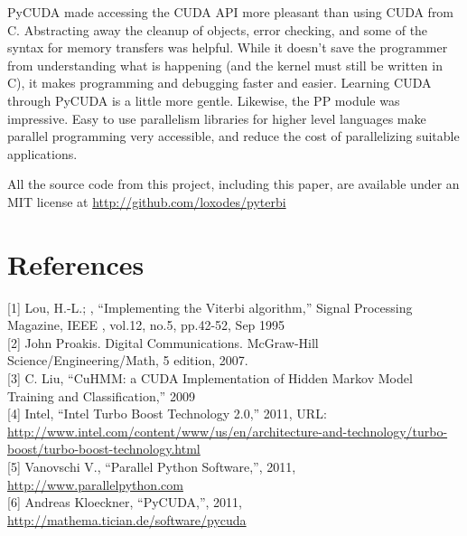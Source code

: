\documentclass[journal,onecolumn]{IEEEtran}
\begin{document}
PyCUDA made accessing the CUDA API more pleasant than using CUDA from C. Abstracting away the cleanup of objects, error checking, and some of the syntax for memory transfers was helpful. While it doesn't save the programmer from understanding what is happening (and the kernel must still be written in C), it makes programming and debugging faster and easier. Learning CUDA through PyCUDA is a little more gentle. Likewise, the PP module was impressive. Easy to use parallelism libraries for higher level languages make parallel programming very accessible, and reduce the cost of parallelizing suitable applications.

All the source code from this project, including this paper, are available under an MIT license at \url{http://github.com/loxodes/pyterbi}

\section*{References}
        [1] Lou, H.-L.; , ``Implementing the Viterbi algorithm,'' Signal Processing Magazine, IEEE , vol.12, no.5, pp.42-52, Sep 1995 \\

        [2] John Proakis. Digital Communications. McGraw-Hill Science/Engineering/Math, 5 edition, 2007. \\

        [3] C. Liu, ``CuHMM: a CUDA Implementation of Hidden Markov Model Training and Classification,'' 2009 \\

        [4] Intel, ``Intel Turbo Boost Technology 2.0,'' 2011, URL: \url{http://www.intel.com/content/www/us/en/architecture-and-technology/turbo-boost/turbo-boost-technology.html}\\

        [5] Vanovschi V., ``Parallel Python Software,'', 2011, \url{http://www.parallelpython.com}\\

        [6] Andreas Kloeckner, ``PyCUDA,'', 2011, \url{http://mathema.tician.de/software/pycuda}\\
\end{document}
